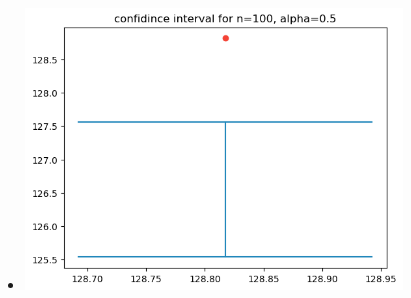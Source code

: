 \documentclass[12pt,twoside]{article}
\begin{document}
\begin{enumerate}
\begin{enumerate}
\begin{itemize}
        \item \includegraphics[width=10cm]{homework/homework_3/immages/hw_4_7.png}
    \end{itemize}
\end{enumerate}


\end{enumerate}
\end{document}
